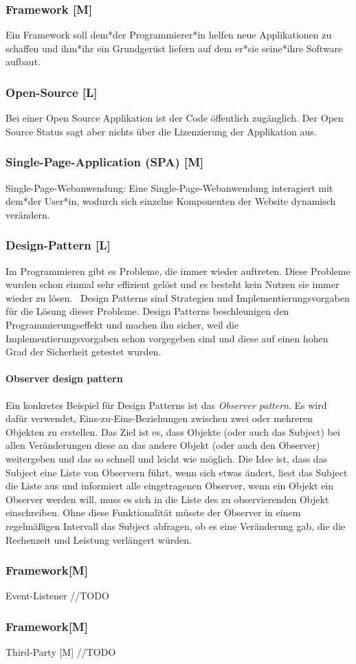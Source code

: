 \subsubsection{Framework [M]}

Ein Framework soll dem*der Programmierer*in helfen neue Applikationen zu schaffen und ihm*ihr ein Grundgerüst liefern auf dem er*sie seine*ihre Software aufbaut.  

\subsubsection{Open-Source [L]}
Bei einer Open Source Applikation ist der Code öffentlich zugänglich. Der Open Source Status sagt aber nichts über die Lizenzierung der Applikation aus. 

\subsubsection{Single-Page-Application (SPA) [M]}
Single-Page-Webanwendung: 
Eine Single-Page-Webanwendung interagiert mit dem*der User*in, wodurch sich einzelne Komponenten der Website dynamisch verändern.

\subsubsection{Design-Pattern [L]}
Im Programmieren gibt es Probleme, die immer wieder auftreten. Diese Probleme wurden schon einmal sehr effizient gelöst und es besteht kein Nutzen sie immer wieder zu lösen.  Design Patterns sind Strategien und Implementierungsvorgaben für die Lösung dieser Probleme. Design Patterns beschleunigen den Programmierungseffekt und machen ihn sicher, weil die Implementierungsvorgaben schon vorgegeben sind und diese auf einen hohen Grad der Sicherheit getestet wurden. \cite{DesignPatterns}

\paragraph{Observer design pattern}
Ein konkretes Beispiel für Design Patterns ist das \emph{Observer pattern}. Es wird dafür verwendet, Eins-zu-Eins-Beziehungen zwischen zwei oder mehreren Objekten zu erstellen. Das Ziel ist es, dass Objekte (oder auch das Subject) bei allen Veränderungen diese an das andere Objekt (oder auch den Observer) weitergeben und das so schnell und leicht wie möglich. Die Idee ist, dass das Subject eine Liste von Observern führt, wenn sich etwas ändert, liest das Subject die Liste aus und informiert alle eingetragenen Observer, wenn ein Objekt ein Observer werden will, muss es sich in die Liste des zu observierenden Objekt einschreiben. Ohne diese Funktionalität müsste der Observer in einem regelmäßigen Intervall das Subject abfragen, ob es eine Veränderung gab, die die Rechenzeit und Leistung verlängert würden. \cite{ObserverPatternExplaination}

\subsubsection{Framework[M]}
Event-Listener
//TODO

\subsubsection{Framework[M]}
Third-Party [M]
//TODO
